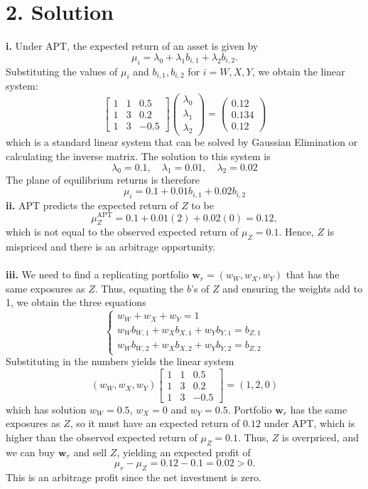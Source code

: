 \documentclass[11pt]{article}
\begin{document}
	\section*{2. Solution}
		\textbf{i. }  Under APT, the expected return of an asset is given by 
		\[	\mu_{i} = \lambda_{0} + \lambda_1 b_{i,1} + \lambda_{2} b_{i,2}.
			\]
		Substituting the values of $\mu_{i}$ and $b_{i,1}, b_{i,2}$ for $i=W,X,Y$, we obtain the linear system:
		\[	\begin{bmatrix}
				1 & 1 & 0.5 \\
				1 & 3 & 0.2 \\
				1 & 3 & -0.5 
				\end{bmatrix}
			\begin{pmatrix}
				\lambda_{0} \\ \lambda_{1} \\ \lambda_{2}
			\end{pmatrix}
			 = 
			 \begin{pmatrix}
			  0.12 \\ 0.134 \\ 0.12
			 \end{pmatrix}
			\]
		which is a standard linear system that can be solved by Gaussian Elimination or calculating the inverse matrix. The solution to this system is 
		\[	\lambda_0 = 0.1,\quad \lambda_{1} = 0.01, \quad\lambda_{2} = 0.02
			\]
		The plane of equilibrium returns is therefore
		\[	\mu_{i} = 0.1 + 0.01b_{i,1} + 0.02 b_{i,2}
			\]
		\textbf{ii. } 
		APT predicts the expected return of $Z$ to be 
		\[	\mu_{Z}^{\text{APT}} = 0.1 + 0.01(2) + 0.02(0) = 0.12,
			\]
		which is not equal to the observed expected return of $\mu_{Z}=0.1$. Hence, $Z$ is mispriced and there is an arbitrage opportunity.\\\\	
		\textbf{iii. } We need to find a replicating portfolio $\bm{w}_{r} = (w_W, w_X, w_Y)$ that has the same exposures as $Z$. Thus, equating the $b$'s of $Z$ and ensuring the weights add to 1, we obtain the three equations
		\[	\begin{cases}
				w_W + w_X + w_Y = 1 \\
				w_W b_{W, 1} + w_X b_{X,1} + w_Y b_{Y,1} = b_{Z, 1} \\ 
				w_W b_{W, 2} + w_X b_{X,2} + w_Y b_{Y,2} = b_{Z, 2}
				\end{cases}	
			\]
		Substituting in the numbers yields the linear system 
		\[	(w_W, w_X, w_Y) \begin{bmatrix}
		1 & 1 & 0.5 \\
		1 & 3 & 0.2 \\
		1 & 3 & -0.5 
		\end{bmatrix} = (1, 2, 0)
			\]
		which has solution $w_W = 0.5$, $w_X = 0$ and $w_Y = 0.5$. Portfolio $\bm{w}_{r}$ has the same exposures as $Z$, so it must have an expected return of $0.12$ under APT, which is higher than the observed expected return of $\mu_Z = 0.1$. Thus, $Z$ is overpriced, and we can buy $\bm{w}_{r}$ and sell $Z$, yielding an expected profit of 
		\[	\mu_{r} - \mu_{Z} = 0.12 - 0.1 = 0.02 > 0.
			\]
		This is an arbitrage profit since the net investment is zero.
	
\end{document}
